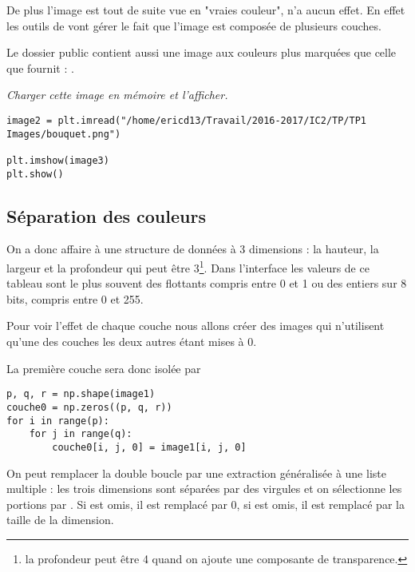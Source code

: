 De plus l'image est tout de suite vue en "vraies couleur",  n'a aucun effet.
En effet les outils de  vont gérer le fait que l'image est composée de plusieurs couches.

\medskip

Le dossier public contient aussi une image aux couleurs plus marquées que celle que fournit  : .
\begin{Exercise}\it Charger cette image en mémoire et l'afficher.
\end{Exercise}
\begin{Answer}
\begin{lstlisting}
image2 = plt.imread("/home/ericd13/Travail/2016-2017/IC2/TP/TP1 Images/bouquet.png")

plt.imshow(image3)
plt.show()
\end{lstlisting}
\end{Answer}
\subsection{Séparation des couleurs}
On a donc affaire à une structure de données à 3 dimensions : la hauteur, la largeur et la profondeur qui peut être 3\footnote{la profondeur peut être 4 quand on ajoute une composante de transparence.}. Dans l'interface  les valeurs de ce tableau sont le plus souvent des flottants compris entre 0 et 1 ou des entiers sur 8 bits, compris entre 0 et 255.

Pour voir l'effet de chaque couche nous allons créer des images qui n'utilisent qu'une des couches les deux autres étant mises à 0.

La première couche sera donc isolée par 
\begin{lstlisting}
p, q, r = np.shape(image1)
couche0 = np.zeros((p, q, r))
for i in range(p):
    for j in range(q):
        couche0[i, j, 0] = image1[i, j, 0]
\end{lstlisting}
On peut remplacer la double boucle par une extraction généralisée à une liste multiple : les trois dimensions sont séparées par des virgules et on sélectionne les portions par . Si  est omis, il est remplacé par 0,  si  est omis, il est remplacé par la taille de la dimension.


